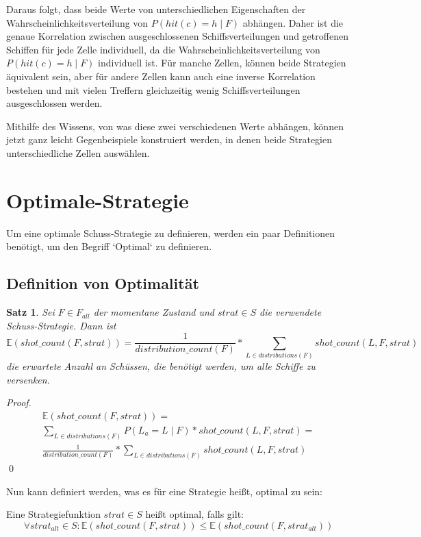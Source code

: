 \documentclass[a4paper,12pt]{llncs}
\numberwithin{equation}{section}
\newtheorem{satz}{Satz}
\begin{document}
Daraus folgt, dass beide Werte von unterschiedlichen Eigenschaften der Wahrscheinlichkeitsverteilung von $P(hit(c)=h \mid F)$ abhängen. Daher ist die genaue Korrelation zwischen ausgeschlossenen Schiffsverteilungen und getroffenen Schiffen für jede Zelle individuell, da die Wahrscheinlichkeitsverteilung von $P(hit(c)=h \mid F)$ individuell ist. Für manche Zellen, können beide Strategien äquivalent sein, aber für andere Zellen kann auch eine inverse Korrelation bestehen und mit vielen Treffern gleichzeitig wenig Schiffsverteilungen ausgeschlossen werden.

Mithilfe des Wissens, von was diese zwei verschiedenen Werte abhängen, können jetzt ganz leicht Gegenbeispiele konstruiert werden, in denen beide Strategien unterschiedliche Zellen auswählen.


\section{Optimale-Strategie}

Um eine optimale Schuss-Strategie zu definieren, werden ein paar Definitionen benötigt, um den Begriff `Optimal` zu definieren.

\subsection{Definition von Optimalität}

\begin{satz}
Sei $F\in F_{all}$ der momentane Zustand und $strat \in S$ die verwendete Schuss-Strategie.
Dann ist
\[
\mathds{E}(shot\_count(F, strat))=\frac{1}{distribution\_count(F)} * \sum_{L \in distributions(F)}{shot\_count(L, F, strat)}
\]
die erwartete Anzahl an Schüssen, die benötigt werden, um alle Schiffe zu versenken.
\end{satz}

\begin{proof}
\begin{align}
\mathds{E}(shot\_count(F, strat))=\\
\sum_{L \in distributions(F)}{P(L_a= L \mid F) * shot\_count(L, F, strat)} =\\
\frac{1}{distribution\_count(F)} * \sum_{L \in distributions(F)}{shot\_count(L, F, strat)}
\end{align}
\qed
\end{proof}

Nun kann definiert werden, was es für eine Strategie heißt, optimal zu sein:
\begin{definition}
Eine Strategiefunktion $strat \in S$ heißt optimal, falls gilt:
\[
\forall strat_{alt} \in S \colon \mathds{E}(shot\_count(F, strat)) \leq \mathds{E}(shot\_count(F, strat_{alt}))
\]
\end{definition}
\end{document}
